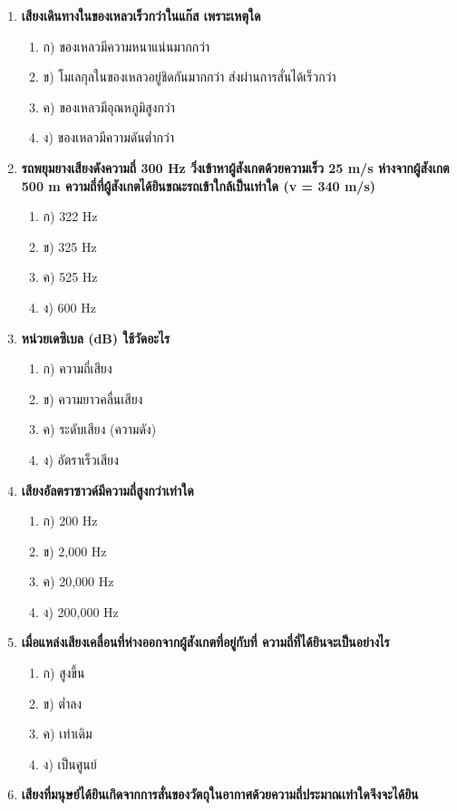 \documentclass[12pt]{article}
\begin{document}
\begin{enumerate}
\begin{enumerate}
\end{enumerate}
\item \textbf{เสียงเดินทางในของเหลวเร็วกว่าในแก๊ส เพราะเหตุใด}
\begin{enumerate}
\item ก) ของเหลวมีความหนาแน่นมากกว่า
\item ข) โมเลกุลในของเหลวอยู่ชิดกันมากกว่า ส่งผ่านการสั่นได้เร็วกว่า
\item ค) ของเหลวมีอุณหภูมิสูงกว่า
\item ง) ของเหลวมีความดันต่ำกว่า
\end{enumerate}
\item \textbf{รถพยุมยางเสียงดังความถี่ 300 Hz วิ่งเข้าหาผู้สังเกตด้วยความเร็ว 25 m/s ห่างจากผู้สังเกต 500 m ความถี่ที่ผู้สังเกตได้ยินขณะรถเข้าใกล้เป็นเท่าใด (v = 340 m/s)}
\begin{enumerate}
\item ก) 322 Hz
\item ข) 325 Hz
\item ค) 525 Hz
\item ง) 600 Hz
\end{enumerate}
\item \textbf{หน่วยเดซิเบล (dB) ใช้วัดอะไร}
\begin{enumerate}
\item ก) ความถี่เสียง
\item ข) ความยาวคลื่นเสียง
\item ค) ระดับเสียง (ความดัง)
\item ง) อัตราเร็วเสียง
\end{enumerate}
\item \textbf{เสียงอัลตราซาวด์มีความถี่สูงกว่าเท่าใด}
\begin{enumerate}
\item ก) 200 Hz
\item ข) 2,000 Hz
\item ค) 20,000 Hz
\item ง) 200,000 Hz
\end{enumerate}
\item \textbf{เมื่อแหล่งเสียงเคลื่อนที่ห่างออกจากผู้สังเกตที่อยู่กับที่ ความถี่ที่ได้ยินจะเป็นอย่างไร}
\begin{enumerate}
\item ก) สูงขึ้น
\item ข) ต่ำลง
\item ค) เท่าเดิม
\item ง) เป็นศูนย์
\end{enumerate}
\item \textbf{เสียงที่มนุษย์ได้ยินเกิดจากการสั่นของวัตถุในอากาศด้วยความถี่ประมาณเท่าใดจึงจะได้ยิน}

\end{enumerate}
\end{document}
